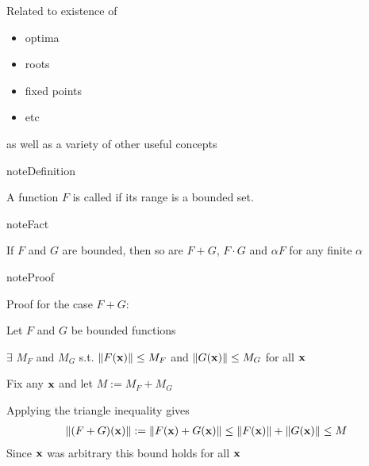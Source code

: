 \documentclass[letterpaper,10pt,english]{jupyterBook}
\begin{document}
\sphinxAtStartPar
Related to existence of
\begin{itemize}
\item {} 
\sphinxAtStartPar
optima

\item {} 
\sphinxAtStartPar
roots

\item {} 
\sphinxAtStartPar
fixed points

\item {} 
\sphinxAtStartPar
etc

\end{itemize}

\sphinxAtStartPar
as well as a variety of other useful concepts

\begin{sphinxadmonition}{note}{Definition}

\sphinxAtStartPar
A function \(F\) is called  if its range is a bounded set.
\end{sphinxadmonition}

\begin{sphinxadmonition}{note}{Fact}

\sphinxAtStartPar
If \(F\) and \(G\) are bounded, then so are \(F+G\), \(F \cdot G\) and \(\alpha F\) for any finite \(\alpha\)
\end{sphinxadmonition}

\begin{sphinxadmonition}{note}{Proof}

\sphinxAtStartPar
Proof for the case \(F + G\):

\sphinxAtStartPar
Let \(F\) and \(G\) be bounded functions

\sphinxAtStartPar
\(\exists\) \(M_F\) and \(M_G\) s.t.
\(\| F({\bf x}) \| \leq M_F\) and \(\| G({\bf x}) \| \leq M_G\)
for all \({\bf x}\)

\sphinxAtStartPar
Fix any \({\bf x}\) and let \(M := M_F + M_G\)

\sphinxAtStartPar
Applying the triangle inequality gives
\begin{equation*}
\begin{split}
\| (F + G)({\bf x}) \|
:= \| F({\bf x}) + G({\bf x}) \|
\leq \| F({\bf x}) \| + \| G({\bf x}) \| 
\leq M
\end{split}
\end{equation*}
\sphinxAtStartPar
Since \({\bf x}\) was arbitrary this bound holds for all \({\bf x}\)
\end{sphinxadmonition}
\end{document}
